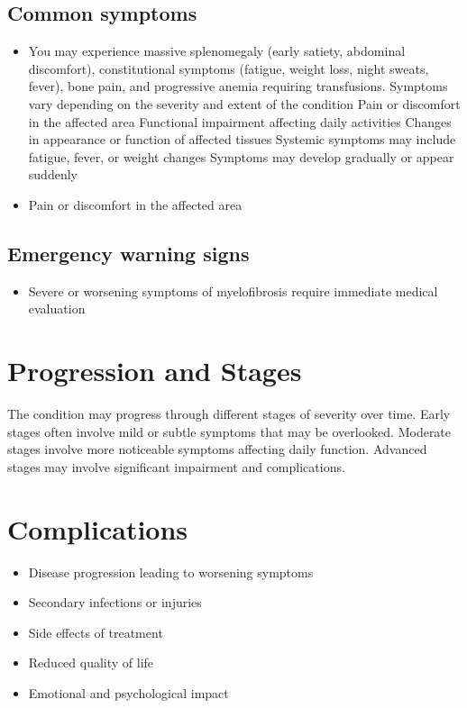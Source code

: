 \subsection{Common symptoms}
\begin{itemize}[noitemsep]
  \item You may experience massive splenomegaly (early satiety, abdominal discomfort), constitutional symptoms (fatigue, weight loss, night sweats, fever), bone pain, and progressive anemia requiring transfusions. Symptoms vary depending on the severity and extent of the condition Pain or discomfort in the affected area Functional impairment affecting daily activities Changes in appearance or function of affected tissues Systemic symptoms may include fatigue, fever, or weight changes Symptoms may develop gradually or appear suddenly
  \item Pain or discomfort in the affected area
  \end{itemize}

\subsection{Emergency warning signs}
\begin{itemize}[noitemsep]
  \item Severe or worsening symptoms of myelofibrosis require immediate medical evaluation
\end{itemize}
\section{Progression and Stages}
The condition may progress through different stages of severity over time. Early stages often involve mild or subtle symptoms that may be overlooked. Moderate stages involve more noticeable symptoms affecting daily function. Advanced stages may involve significant impairment and complications.
\section{Complications}
\begin{itemize}[noitemsep]
  \item Disease progression leading to worsening symptoms
  \item Secondary infections or injuries
  \item Side effects of treatment
  \item Reduced quality of life
  \item Emotional and psychological impact
\end{itemize}
